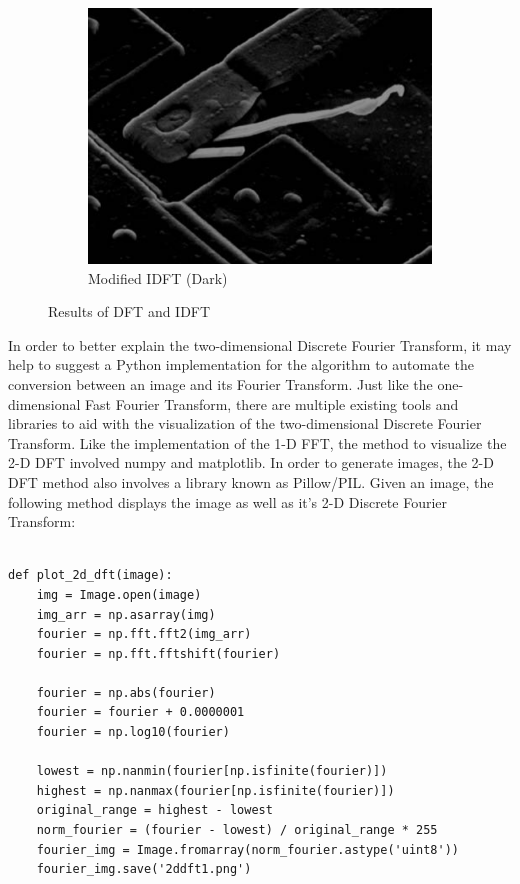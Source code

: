 \documentclass{amsproc}
\begin{document}
\begin{figure}[h]
\begin{subfigure}{.3\textwidth}
	\includegraphics[scale=.25]{images/dftimage3.png}
	\caption{Modified IDFT (Dark)}
	\label{fig:sub10}
\end{subfigure}
\caption{Results of DFT and IDFT}
\label{fig:im2}
\end{figure}

In order to better explain the two-dimensional Discrete Fourier Transform, it may help to suggest a Python implementation for the algorithm to automate the conversion between an image and its Fourier Transform. Just like the one-dimensional Fast Fourier Transform, there are multiple existing tools and libraries to aid with the visualization of the two-dimensional Discrete Fourier Transform. Like the implementation of the 1-D FFT, the method to visualize the 2-D DFT involved numpy and matplotlib. In order to generate images, the 2-D DFT method also involves a library known as Pillow/PIL. Given an image, the following method displays the image as well as it's 2-D Discrete Fourier Transform:

\begin{Verbatim}[tabsize=4]

def plot_2d_dft(image):
	img = Image.open(image)
	img_arr = np.asarray(img)
	fourier = np.fft.fft2(img_arr)
	fourier = np.fft.fftshift(fourier)
	
	fourier = np.abs(fourier)
	fourier = fourier + 0.0000001
	fourier = np.log10(fourier)
	
	lowest = np.nanmin(fourier[np.isfinite(fourier)])
	highest = np.nanmax(fourier[np.isfinite(fourier)])
	original_range = highest - lowest
	norm_fourier = (fourier - lowest) / original_range * 255
	fourier_img = Image.fromarray(norm_fourier.astype('uint8'))
	fourier_img.save('2ddft1.png')
	
\end{Verbatim}
\end{document}
